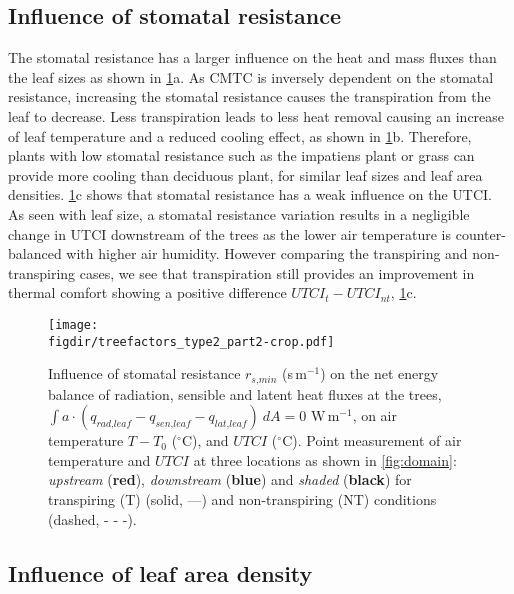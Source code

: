 \subsection{Influence of stomatal resistance}

The stomatal resistance has a larger influence on the heat and mass fluxes than the leaf sizes as shown in \cref{fig:treefactorspart2}a. As CMTC is inversely dependent on the stomatal resistance, increasing the stomatal resistance causes the transpiration from the leaf to decrease. Less transpiration leads to less heat removal causing an increase of leaf temperature and a reduced cooling effect, as shown in \cref{fig:treefactorspart2}b. Therefore, plants with low stomatal resistance such as the impatiens plant or grass can provide more cooling than deciduous plant, for similar leaf sizes and leaf area densities. \cref{fig:treefactorspart2}c shows that stomatal resistance has a weak influence on the UTCI. As seen with leaf size, a stomatal resistance variation results in a negligible change in UTCI downstream of the trees as the lower air temperature is counter-balanced with higher air humidity. However comparing the transpiring and non-transpiring cases, we see that transpiration still provides an improvement in thermal comfort showing a positive difference $\textit{UTCI}_t-\textit{UTCI}_{\textit{nt}}$, \cref{fig:treefactorspart2}c.

	\begin{figure}[t]
		\centering
		\texttt{[image: \\figdir/treefactors\_type2\_part2-crop.pdf]}
		\caption{Influence of stomatal resistance $r_{\textit{s,min}}$ (s\,m$^{-1}$) on  the net energy balance of radiation, sensible and latent heat fluxes at the trees, $\int a \cdot (q_{\textit{rad,leaf}}-q_{\textit{sen,leaf}}-q_{\textit{lat,leaf}})\ dA = 0$ W\,m$^{-1}$,  on air temperature $T-T_0$ ($^{\circ}$C), and  $\textit{UTCI}$ ($^{\circ}$C). Point measurement of air temperature and $UTCI$ at three locations as shown in \cref{fig:domain}: \textit{upstream} ({\color{flatuidarkred}\textbf{red}}), \textit{downstream} ({\color{flatuidarkblue}\textbf{blue}}) and \textit{shaded} (\textbf{black}) for transpiring (T) (solid, ---) and non-transpiring (NT) conditions (dashed, - - -).}
		\label{fig:treefactorspart2}
	\end{figure}

\subsection{Influence of leaf area density}

